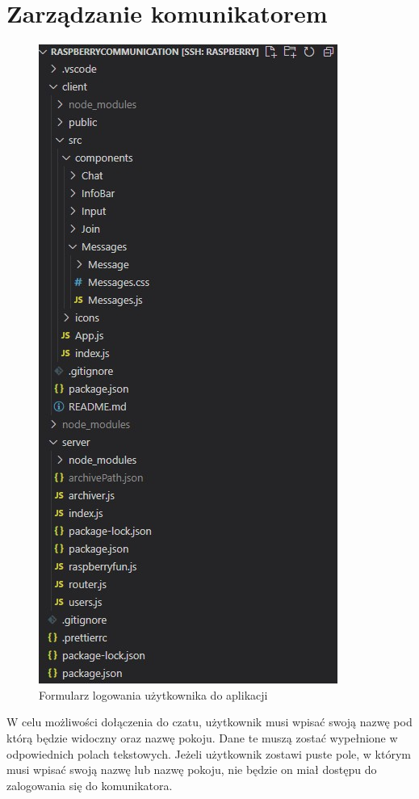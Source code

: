 \section{Zarządzanie komunikatorem}
\begin{figure}
	\centering
	\includegraphics[width=0.5\linewidth]{"obrazy/model"}
	\caption{Formularz logowania użytkownika do aplikacji}
	\label{fig:39}
\end{figure}
W celu możliwości dołączenia do czatu, użytkownik musi wpisać swoją nazwę pod którą będzie widoczny oraz nazwę pokoju. Dane te muszą zostać wypełnione w odpowiednich polach tekstowych. Jeżeli użytkownik zostawi puste pole, w którym musi wpisać swoją nazwę lub nazwę pokoju, nie będzie on miał dostępu do zalogowania się do komunikatora.
